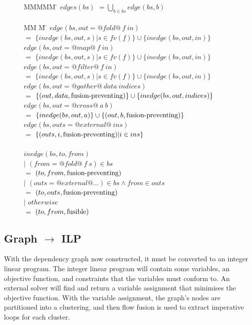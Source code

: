 \begin{figure}[H]
\begin{tabbing}
MMMMM       \= \kill
$edges(bs)$ \> $= \bigcup_{b \in bs}edge(bs, b)$    \\
\\
MM             \= M \= \kill
$edge(bs, out = @fold@~f~in)$ \\
    \> $=$    \> $\{inedge(bs,out,s) | s \in fv(f)\} \cup \{inedge(bs, out, in) \}$       \\
$edge(bs, out = @map@~f~in)$  \\
    \> $=$    \> $\{inedge(bs,out,s) | s \in fv(f)\} \cup \{inedge(bs, out, in) \}$       \\
$edge(bs, out = @filter@~f~in)$  \\
    \> $=$    \> $\{inedge(bs,out,s) | s \in fv(f)\} \cup \{inedge(bs, out, in) \}$       \\
$edge(bs, out = @gather@~data~indices)$  \\
    \> $=$    \> $\{(out,data, \mbox{fusion-preventing}) \} \cup \{inedge(bs, out, indices) \}$       \\
$edge(bs, out = @cross@~a~b)$            \\
    \> $=$    \> $\{inedge(bs, out, a) \}           \cup      \{(out, b, \mbox{fusion-preventing}) \}$ \\
$edge(bs, outs = @external@~ins)$  \\
    \> $=$    \> $\{(outs,i, \mbox{fusion-preventing}) | i \in ins \}$ \\
\\
$inedge(bs,to,from)$ \\
    \> $|$ \> $(from = @fold@~f~s) \in bs$     \\
    \> $=$ \> $(to, from, \mbox{fusion-preventing})$  \\
    \> $|$ \> $(outs = @external@ \ldots) \in bs     \wedge from \in outs$     \\
    \> $=$ \> $(to, outs, \mbox{fusion-preventing})$  \\
    \> $|$ \> $otherwise$                      \\
    \> $=$ \> $(to, from, \mathrm{fusible})$            \\
\end{tabbing}
\end{figure}


\subsection{Graph $\to$ ILP}
With the dependency graph now constructed, it must be converted to an integer linear program. The integer linear program will contain some variables, an objective function, and constraints that the variables must conform to. An external solver will find and return a variable assignment that minimises the objective function. With the variable assignment, the graph's nodes are partitioned into a clustering, and then flow fusion\cite{lippmeier2013flow} is used to extract imperative loops for each cluster.

